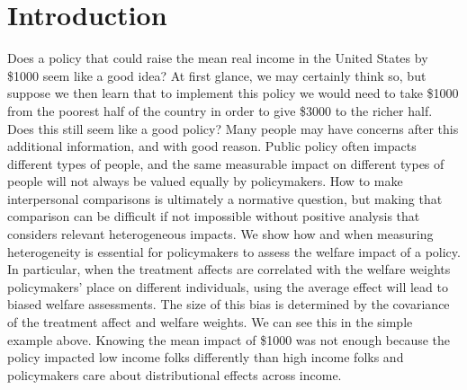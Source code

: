\documentclass[12pt]{article}
\theoremstyle{definition}
\theoremstyle{definition}
\theoremstyle{definition}
\theoremstyle{definition}
\begin{document}
\onehalfspacing
\section{Introduction}

    Does a policy that could raise the mean real income in the United States by \$1000 seem like a good idea? At first glance, we may certainly think so, but suppose we then learn that to implement this policy we would need to take \$1000 from the poorest half of the country in order to give \$3000 to the richer half. Does this still seem like a good policy? Many people may have concerns after this additional information, and with good reason. Public policy often impacts different types of people, and the same measurable impact on different types of people will not always be valued equally by policymakers. How to make interpersonal comparisons is ultimately a normative question, but making that comparison can be difficult if not impossible without positive analysis that considers relevant heterogeneous impacts. We show how and when measuring heterogeneity is essential for policymakers to assess the  welfare impact of a policy. In particular, when the treatment affects are correlated with the welfare weights policymakers' place on different individuals, using the average effect will lead to biased welfare assessments. The size of this bias is determined by the covariance of the treatment affect and welfare weights. We can see this in the simple example above. Knowing the mean impact of \$1000 was not enough because the policy impacted low income folks differently than high income folks and policymakers care about distributional effects across income. 
\end{document}
